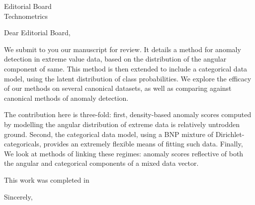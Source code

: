 \documentclass[letterpaper,11pt]{letter}
\begin{document}
%

\begin{letter}{Editorial Board \\ Technometrics}

\opening{Dear Editorial Board,}

We submit to you our manuscript for review.  It details a method for anomaly detection in
extreme value data, based on the distribution of the angular component of same.  This method
is then extended to include a categorical data model, using the latent distribution of class
probabilities.  We explore the efficacy of our methods on several canonical datasets,
as well as comparing against canonical methods of anomaly detection.

The contribution here is three-fold: first, density-based anomaly scores computed by modelling the
angular distribution of extreme data is relatively untrodden ground.  Second, the categorical data
model, using a BNP mixture of Dirichlet-categoricals, provides an extremely flexible means of
fitting such data.   Finally, We look at methods of linking these regimes: anomaly scores reflective of
both the angular and categorical components of a mixed data vector.

This work was completed in 

Sincerely,

\closing{~}

\end{letter}
\end{document}
